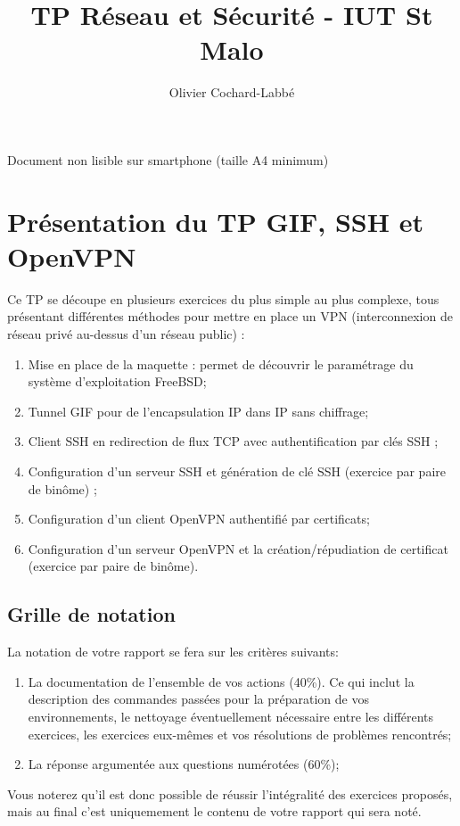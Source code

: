 \documentclass[a4paper,11pt]{article}
\author{Olivier Cochard-Labbé}
\title{TP Réseau et Sécurité - IUT St Malo}
\begin{document}
\maketitle
\centerline{
{\Large
{\selectfont{}\relax}
Document non lisible sur smartphone (taille A4 minimum)
}
}
\tableofcontents
\clearpage
\sloppy
\section{Présentation du TP GIF, SSH et OpenVPN}
Ce TP se découpe en plusieurs exercices du plus simple au plus complexe, tous présentant différentes méthodes pour mettre en place un VPN (interconnexion de réseau privé au-dessus d'un réseau public) :
\begin{enumerate}
\item  Mise en place de la maquette : permet de découvrir le paramétrage du système d'exploitation FreeBSD;
\item Tunnel GIF pour de l'encapsulation IP dans IP sans chiffrage;
\item Client SSH en redirection de flux TCP avec authentification par clés SSH ;
\item Configuration d'un serveur SSH et génération de clé SSH (exercice par paire de binôme) ;
\item Configuration d'un client OpenVPN authentifié par certificats;
\item Configuration d'un serveur OpenVPN et la création/répudiation de certificat (exercice par paire de binôme).
\end{enumerate}
\subsection{Grille de notation}
La notation de votre rapport se fera sur les critères suivants:
\begin{enumerate}
\item La documentation de l'ensemble de vos actions (40\%). Ce qui inclut la description des commandes passées pour la préparation de vos environnements, le nettoyage éventuellement nécessaire entre les différents exercices, les exercices eux-mêmes et vos résolutions de problèmes rencontrés;
\item La réponse argumentée aux questions numérotées (60\%);
\end{enumerate}
Vous noterez qu'il est donc possible de réussir l'intégralité des exercices proposés, mais au final c'est uniquemement le contenu de votre rapport qui sera noté.
\end{document}
